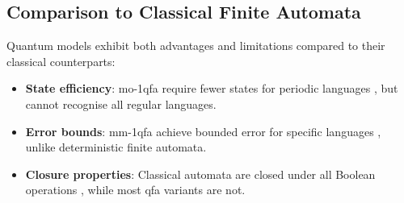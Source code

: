 \subsection*{Comparison to Classical Finite Automata}
\label{subsec:classical-comparison}
Quantum models exhibit both advantages and limitations compared to their classical counterparts:
\begin{itemize}
    \item \textbf{State efficiency}: \gls{mo-1qfa} require fewer states for periodic languages \cite{kondacs1997power}, but cannot recognise all regular languages.
    \item \textbf{Error bounds}: \gls{mm-1qfa} achieve bounded error for specific languages \cite{ambainis1998}, unlike deterministic finite automata.
    \item \textbf{Closure properties}: Classical automata are closed under all Boolean operations \cite{rabin1959}, while most \gls{qfa} variants are not.
\end{itemize}

